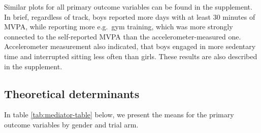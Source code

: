 \documentclass[english,man,floatsintext]{apa6}
\begin{document}
Similar plots for all primary outcome variables can be found in the supplement. In brief, regardless of track, boys reported more days with at least 30 minutes of MVPA, while reporting more e.g.~gym training, which was more strongly connected to the self-reported MVPA than the accelerometer-measured one. Accelerometer measurement also indicated, that boys engaged in more sedentary time and interrupted sitting less often than girls. These results are also described in the supplement.

\hypertarget{theoretical-determinants}{%
\subsection{Theoretical determinants}\label{theoretical-determinants}}

In table \ref{tab:mediator-table} below, we present the means for the primary outcome variables by gender and trial arm.
\end{document}
